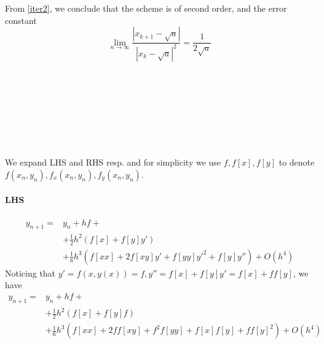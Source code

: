 \documentclass{article}
\begin{document}
From \eqref{iter2}, we conclude that the scheme is of second order, and the error constant $$\lim_{n\to \infty} \frac{|x_{k+1} - \sqrt a|}{|x_{k} - \sqrt a|^2} = \frac{1}{2\sqrt a}$$
\section{~}
\subsection{~}
We expand LHS and RHS resp. and for simplicity we use $f, f[x], f[y]$ to denote $f(x_n, y_n), f_x(x_n,y_n), f_y(x_n,y_n)$.
\paragraph{LHS}
\begin{equation}
\begin{split}
y_{n+1} =& y_n + hf + \\
&+\frac{1}{2}h^2(f[x] + f[y]y') \\
&+ \frac{1}{6}h^3(f[xx] + 2f[xy]y' + f[yy]y'^2 + f[y]y'') + O(h^4)
\end{split}
\end{equation}
Noticing that $y' = f(x,y(x)) = f, y'' = f[x] + f[y]y' = f[x] + ff[y]$, we have 
\begin{equation}
\begin{split}
y_{n+1} =& y_n + hf + \\
&+\frac{1}{2}h^2(f[x] + f[y]f) \\
&+ \frac{1}{6}h^3(f[xx] + 2ff[xy] + f^2f[yy] + f[x]f[y]+ff[y]^2) + O(h^4)
\end{split}
\end{equation}
\end{document}
